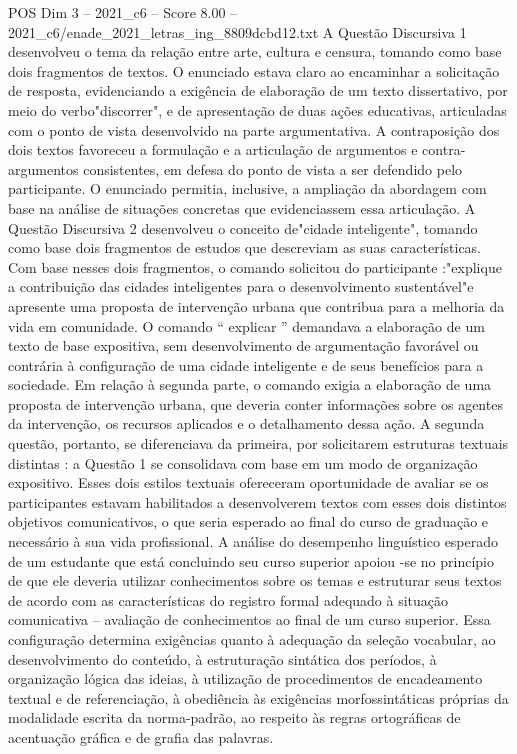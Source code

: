 \begin{textsample}{POS Dim 3 – 2021\_c6 – Score 8.00 – 2021\_c6/enade\_2021\_letras\_ing\_8809dcbd12.txt}
A Questão Discursiva 1 desenvolveu o tema da relação entre arte, cultura e censura, tomando como base dois fragmentos de textos.
O enunciado estava claro ao encaminhar a solicitação de resposta, evidenciando a exigência de elaboração de um texto dissertativo, por meio do verbo"discorrer", e de apresentação de duas ações educativas, articuladas com o ponto de vista desenvolvido na parte argumentativa.
A contraposição dos dois textos favoreceu a formulação e a articulação de argumentos e contra-argumentos consistentes, em defesa do ponto de vista a ser defendido pelo participante.
O enunciado permitia, inclusive, a ampliação da abordagem com base na análise de situações concretas que evidenciassem essa articulação.
A Questão Discursiva 2 desenvolveu o conceito de"cidade inteligente", tomando como base dois fragmentos de estudos que descreviam as suas características.
Com base nesses dois fragmentos, o comando solicitou do participante :"explique a contribuição das cidades inteligentes para o desenvolvimento sustentável"e apresente uma proposta de intervenção urbana que contribua para a melhoria da vida em comunidade.
O comando “ explicar ” demandava a elaboração de um texto de base expositiva, sem desenvolvimento de argumentação favorável ou contrária à configuração de uma cidade inteligente e de seus benefícios para a sociedade.
Em relação à segunda parte, o comando exigia a elaboração de uma proposta de intervenção urbana, que deveria conter informações sobre os agentes da intervenção, os recursos aplicados e o detalhamento dessa ação.
A segunda questão, portanto, se diferenciava da primeira, por solicitarem estruturas textuais distintas : a Questão 1 se consolidava com base em um modo de organização expositivo.
Esses dois estilos textuais ofereceram oportunidade de avaliar se os participantes estavam habilitados a desenvolverem textos com esses dois distintos objetivos comunicativos, o que seria esperado ao final do curso de graduação e necessário à sua vida profissional.
A análise do desempenho linguístico esperado de um estudante que está concluindo seu curso superior apoiou -se no princípio de que ele deveria utilizar conhecimentos sobre os temas e estruturar seus textos de acordo com as características do registro formal adequado à situação comunicativa – avaliação de conhecimentos ao final de um curso superior.
Essa configuração determina exigências quanto à adequação da seleção vocabular, ao desenvolvimento do conteúdo, à estruturação sintática dos períodos, à organização lógica das ideias, à utilização de procedimentos de encadeamento textual e de referenciação, à obediência às exigências morfossintáticas próprias da modalidade escrita da norma-padrão, ao respeito às regras ortográficas de acentuação gráfica e de grafia das palavras.

\end{textsample}
